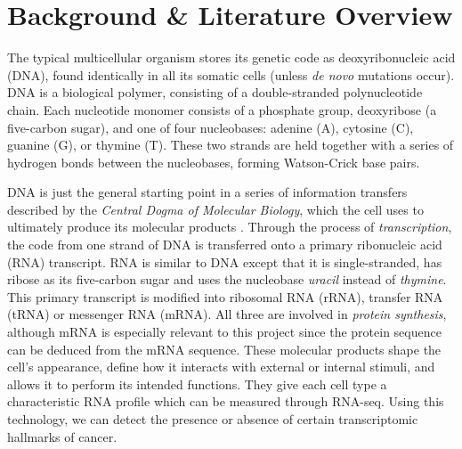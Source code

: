 \chapter{Background \& Literature Overview}
\label{lit review}

The typical multicellular organism stores its genetic code as deoxyribonucleic acid (DNA), found identically in all its somatic cells (unless \textit{de novo} mutations occur). DNA is a biological polymer, consisting of a double-stranded polynucleotide chain. Each nucleotide monomer consists of a phosphate group, deoxyribose (a five-carbon sugar), and one of four nucleobases: adenine (A), cytosine (C), guanine (G), or thymine (T). These two strands are held together with a series of hydrogen bonds between the nucleobases, forming Watson-Crick base pairs. %

DNA is just the general starting point in a series of information transfers described by the \textit{Central Dogma of Molecular Biology}, which the cell uses to ultimately produce its molecular products \citep{cobb201760}. Through the process of \textit{transcription}, the code from one strand of DNA is transferred onto a primary ribonucleic acid (RNA) transcript. RNA is similar to DNA except that it is single-stranded, has ribose as its five-carbon sugar and uses the nucleobase \textit{uracil} instead of \textit{thymine}. This primary transcript is modified into ribosomal RNA (rRNA), transfer RNA (tRNA) or messenger RNA (mRNA). All three are involved in \textit{protein synthesis}, although mRNA is especially relevant to this project since the protein sequence can be deduced from the mRNA sequence. These molecular products shape the cell's appearance, define how it interacts with external or internal stimuli, and allows it to perform its intended functions. They give each cell type a characteristic RNA profile which can be measured through RNA-seq. Using this technology, we can detect the presence or absence of certain transcriptomic hallmarks of cancer.



